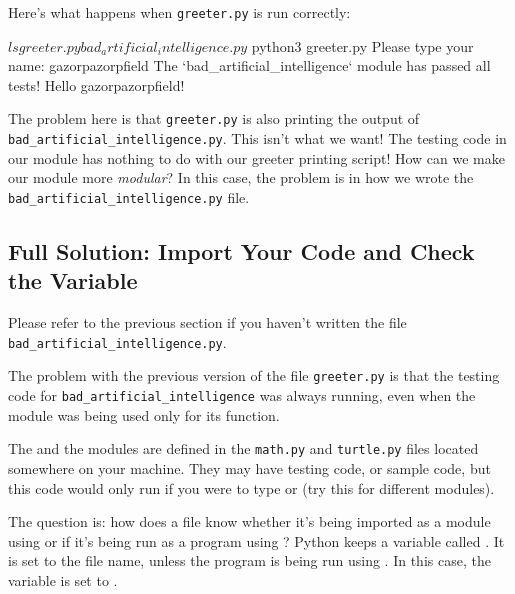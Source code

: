 \documentclass[11pt]{cselabheader}
\begin{document}
{%

Here's what happens when \texttt{greeter.py} is run correctly:

\begin{bashcode}
$ ls
greeter.py  bad_artificial_intelligence.py

$ python3 greeter.py
Please type your name: gazorpazorpfield
The `bad_artificial_intelligence` module has passed all tests!
Hello gazorpazorpfield!
\end{bashcode}

The problem here is that \texttt{greeter.py} is also printing the output of
\texttt{bad\_artificial\_intelligence.py}. This isn't what we want! The testing
code in our module has nothing to do with our greeter printing script! How can
we make our module more \emph{modular}? In this case, the problem is in how we
wrote the \texttt{bad\_artificial\_intelligence.py} file.

\subsection{Full Solution: Import Your Code and Check the  Variable}

Please refer to the previous section if you haven't written the file
\texttt{bad\_artificial\_intelligence.py}.

The problem with the previous version of the file \texttt{greeter.py}
is that the testing code for \texttt{bad\_artificial\_intelligence}
was always running, even when the module was being used only for its
 function.

The  and the  modules are
defined in the \texttt{math.py} and \texttt{turtle.py} files located
somewhere on your machine.  They may have testing code, or sample
code, but this code would only run if you were to type
 or  (try this for different modules).

The question is: how does a file know whether it's being imported as a
module using  or if it's being run as a
program using ? Python keeps a
variable called .  It is set to the file name,
unless the program is being run using .
In this case, the variable is set to .

}
\end{document}
